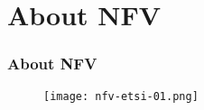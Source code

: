 \section{About NFV}

\begin{frame}[allowframebreaks]
\frametitle{About NFV}

\begin{center}
  \begin{figure}
    \texttt{[image: nfv-etsi-01.png]}
  \end{figure}
\end{center}

\end{frame}
